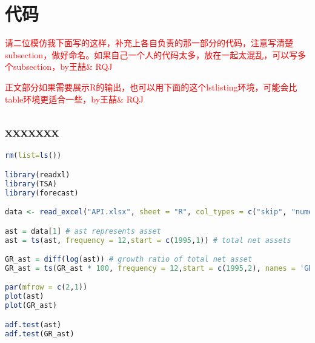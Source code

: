 \section{代码}
\textcolor{red}{请二位模仿我下面写的这样，补充上各自负责的那一部分的代码，注意写清楚subsection，做好命名。如果自己一个人的代码太多，放在一起太混乱，可以写多个subsection，by王喆\& RQJ}

\textcolor{red}{正文部分如果需要展示R的输出，也可以用下面的这个lstlisting环境，可能会比table环境更适合一些，by王喆\& RQJ}
\subsection{xxxxxxx}
\begin{lstlisting}[language=R,frame=single]
rm(list=ls())

library(readxl)
library(TSA)
library(forecast)

data <- read_excel("API.xlsx", sheet = "R", col_types = c("skip", "numeric", "numeric"))

ast = data[1] # ast represents asset
ast = ts(ast, frequency = 12,start = c(1995,1)) # total net assets

GR_ast = diff(log(ast)) # growth ratio of total net asset
GR_ast = ts(GR_ast * 100, frequency = 12,start = c(1995,2), names = 'GR_ast')

par(mfrow = c(2,1))
plot(ast)
plot(GR_ast)

adf.test(ast)
adf.test(GR_ast)
\end{lstlisting}